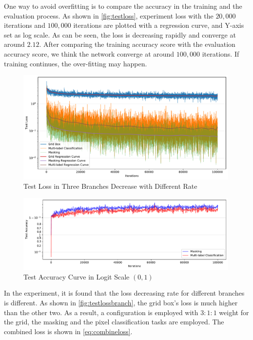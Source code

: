 \begin{spacing}{1.5}
One way to avoid overfitting is to compare the accuracy in the training and the evaluation process. As shown in \autoref{fig:testloss}, experiment loss with the $20,000$ iterations and $100,000$ iterations are plotted with a regression curve, and Y-axis set as log scale. As can be seen, the loss is decreasing rapidly and converge at around $2.12$. After comparing the training accuracy score with the evaluation accuracy score, we think the network converge at around $100,000$ iterations. If training continues, the over-fitting may happen.

\begin{figure}[ht]
\centering
\includegraphics[width=0.99\textwidth, fbox]{Chapter5/testlossbranch.pdf}
\caption{Test Loss in Three Branches Decrease with Different Rate}
\label{fig:testlossbranch} 
\end{figure}

\begin{figure}[ht]
\centering
\includegraphics[width=0.99\textwidth, fbox]{Chapter5/testacc.pdf}
\caption{Test Accuracy Curve in Logit Scale $(0,1)$}
\label{fig:testacc} 
\end{figure}


In the experiment, it is found that the loss decreasing rate for different branches is different. As shown in \autoref{fig:testlossbranch}, the grid box's loss is much higher than the other two. As a result, a configuration is employed with $3:1:1$ weight for the grid, the masking and the pixel classification tasks are employed. The combined loss is shown in \autoref{eq:combineloss}.


\end{spacing}
